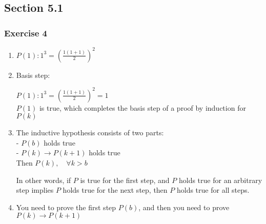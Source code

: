 \documentclass[a4paper]{article}
\newcommand{\ex}[1]{\subsubsection*{#1}}
\begin{document}
\pagestyle{fancy} %



\subsection*{Section 5.1}
\ex{Exercise 4}

\begin{enumerate}[label=\alph*)]
    \item \(P(1): 1^3 = (\frac{1(1+1)}{2})^2\)

    \item Basis step:

        \(P(1): 1^3 = (\frac{1(1+1)}{2})^2 = 1\) \\
        \(P(1)\) is true, which completes the basis step of a proof by
            induction for \(P(k)\)

    \item The inductive hypothesis consists of two parts: \\
        - \(P(b)\) holds true \\
        - \(P(k) \rightarrow P(k+1)\) holds true\\
        Then \(P(k), \quad \forall k > b\)

        In other words, if \(P\) is true for the first step, and \(P\) holds
            true for an arbitrary step implies \(P\) holds true for the next
            step, then \(P\) holds true for all steps. \\

    \item You need to prove the first step \(P(b)\), and then you need to prove
        \(P(k) \rightarrow P(k+1)\)


\end{enumerate}
\end{document}
